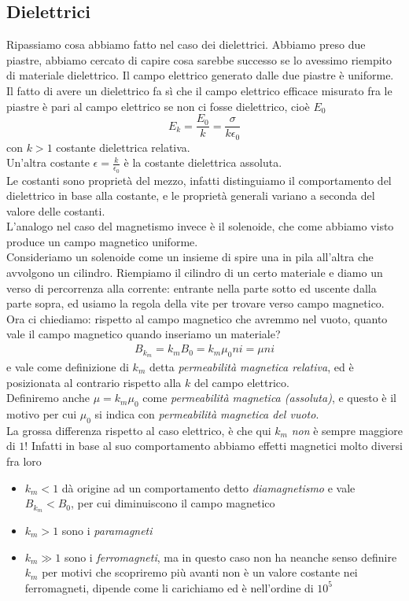 \subsection{Dielettrici}
Ripassiamo cosa abbiamo fatto nel caso dei dielettrici. Abbiamo preso due piastre, abbiamo cercato di capire cosa sarebbe successo se lo avessimo riempito di materiale dielettrico.
Il campo elettrico generato dalle due piastre è uniforme. Il fatto di avere un dielettrico fa sì che il campo elettrico efficace misurato fra le piastre è pari al campo elettrico se non ci fosse dielettrico, cioè $E_0$
\begin{equation*}
	E_k=\frac{E_0}{k}=\frac{\sigma}{k\epsilon_0}
\end{equation*}
con $k>1$ costante dielettrica relativa.\\
Un'altra costante $\epsilon=\frac{k}{\epsilon_0}$ è la costante dielettrica assoluta.\\
Le costanti sono proprietà del mezzo, infatti distinguiamo il comportamento del dielettrico in base alla costante, e le proprietà generali variano a seconda del valore delle costanti.\\ 
L'analogo nel caso del magnetismo invece è il solenoide, che come abbiamo visto produce un campo magnetico uniforme. \\
Consideriamo un solenoide come un insieme di spire una in pila all'altra che avvolgono un cilindro. Riempiamo il cilindro di un certo materiale e diamo un verso di percorrenza alla corrente: entrante nella parte sotto ed uscente dalla parte sopra, ed usiamo la regola della vite per trovare verso campo magnetico.\\
Ora ci chiediamo: rispetto al campo magnetico che avremmo nel vuoto, quanto vale il campo magnetico quando inseriamo un materiale?
\begin{gather*}
	B_{k_m}=k_m B_0=k_m\mu_0 ni=\mu ni
\end{gather*}
e vale come definizione di $k_m$ detta \textit{permeabilità magnetica relativa}, ed è posizionata al contrario rispetto alla $k$ del campo elettrico.\\
Definiremo anche $\mu=k_m\mu_0$ come \textit{permeabilità magnetica (assoluta)}, e questo è il motivo per cui  $\mu_0$ si indica con \textit{permeabilità magnetica del vuoto}.\\
La grossa differenza rispetto al caso elettrico, è che qui $k_m$ \textit{non} è sempre maggiore di $1$! Infatti in base al suo comportamento abbiamo effetti magnetici molto diversi fra loro
\begin{itemize}
	\item $k_m<1$ dà origine ad un comportamento detto \textit{diamagnetismo} e vale $B_{k_m}<B_0$, per cui diminuiscono il campo magnetico
	\item $k_m>1$ sono i \textit{paramagneti} 	
	\item $k_m\gg 1$ sono i \textit{ferromagneti}, ma in questo caso non ha neanche senso definire $k_m$ per motivi che scopriremo più avanti non è un valore costante nei ferromagneti, dipende come li carichiamo ed è nell'ordine di $10^5$	
\end{itemize}

